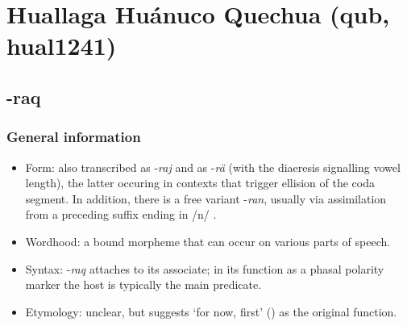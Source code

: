 \section{Huallaga Huánuco Quechua (qub, hual1241)}
\label{appendixQuechua}

\subsection{-raq}
\subsubsection{General information}

\begin{itemize}
	\item Form: also transcribed as \mbox{-\textit{raj}} and as \mbox{-\textit{rä}} (with the diaeresis signalling vowel length), the latter occuring in contexts that trigger ellision of the coda segment. In addition, there is a free variant \mbox{-\textit{ran}}, usually via assimilation from a preceding suffix ending in /n/ .
	\item Wordhood: a bound morpheme that can occur on various parts of speech.
	\item Syntax: \mbox{-\textit{raq}} attaches to its associate; in its function as a phasal polarity marker the host is typically the main predicate.
	\item Etymology: unclear, but \textcite{vanBaar1997} suggests \lq for now, first\rq{ }() as the original function.
\end{itemize}

